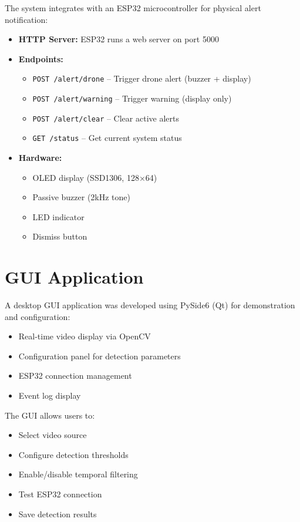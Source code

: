 \documentclass[a4paper,12pt]{report}
\begin{document}
The system integrates with an ESP32 microcontroller for physical alert notification:

\begin{itemize}
    \item \textbf{HTTP Server:} ESP32 runs a web server on port 5000
    \item \textbf{Endpoints:}
    \begin{itemize}
        \item \texttt{POST /alert/drone} -- Trigger drone alert (buzzer + display)
        \item \texttt{POST /alert/warning} -- Trigger warning (display only)
        \item \texttt{POST /alert/clear} -- Clear active alerts
        \item \texttt{GET /status} -- Get current system status
    \end{itemize}
    \item \textbf{Hardware:}
    \begin{itemize}
        \item OLED display (SSD1306, 128$\times$64)
        \item Passive buzzer (2kHz tone)
        \item LED indicator
        \item Dismiss button
    \end{itemize}
\end{itemize}

\section{GUI Application}

A desktop GUI application was developed using PySide6 (Qt) for demonstration and configuration:

\begin{itemize}
    \item Real-time video display via OpenCV
    \item Configuration panel for detection parameters
    \item ESP32 connection management
    \item Event log display
\end{itemize}

The GUI allows users to:
\begin{itemize}
    \item Select video source
    \item Configure detection thresholds
    \item Enable/disable temporal filtering
    \item Test ESP32 connection
    \item Save detection results
\end{itemize}
\end{document}
